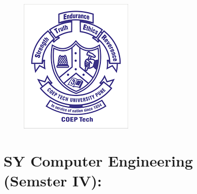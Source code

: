 \documentclass{article}
\begin{document}
\begin{figure}[h]
\centering
\includegraphics[scale=.4]{coep}
\end{figure}

\section{SY Computer Engineering (Semster IV):}

\end{document}

